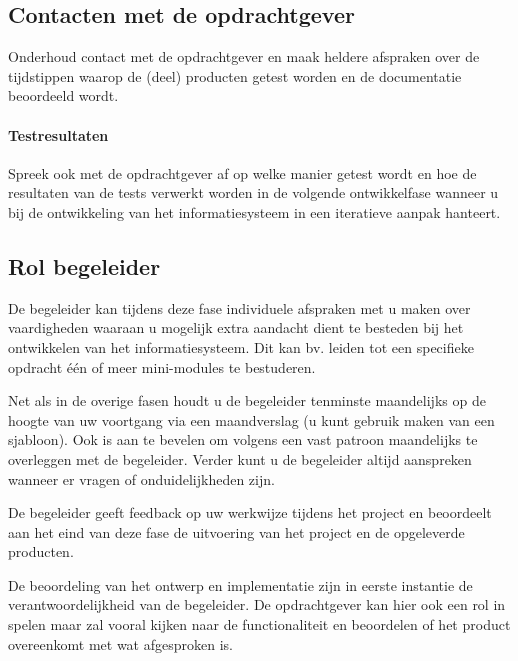 \subsection{Contacten met de opdrachtgever}
    Onderhoud contact met de opdrachtgever en maak heldere afspraken over de
tijdstippen waarop de (deel) producten getest worden en de documentatie
beoordeeld wordt.

\paragraph{Testresultaten}
Spreek ook met de opdrachtgever af op welke manier getest wordt en hoe
de resultaten van de tests verwerkt worden in de volgende ontwikkelfase
wanneer u bij de ontwikkeling van het informatiesysteem in een iteratieve
aanpak hanteert.

\subsection{Rol begeleider}
De begeleider kan tijdens deze fase individuele afspraken met u maken over
vaardigheden waaraan u mogelijk extra aandacht dient te besteden bij het
ontwikkelen van het informatiesysteem. Dit kan bv. leiden tot een specifieke
opdracht één of meer mini-modules te bestuderen.

Net als in de overige fasen houdt u de begeleider tenminste maandelijks op
de hoogte van uw voortgang via een maandverslag (u kunt gebruik maken van een
sjabloon). Ook is aan te bevelen om volgens een vast patroon maandelijks te
overleggen met de begeleider. Verder kunt u de begeleider altijd aanspreken
wanneer er vragen of onduidelijkheden zijn.

De begeleider  geeft feedback op uw werkwijze tijdens het project en
beoordeelt aan het eind van deze fase de uitvoering van het project en de
opgeleverde producten.

De beoordeling van het ontwerp en implementatie zijn in eerste instantie de
verantwoordelijkheid van de begeleider. De opdrachtgever kan hier ook een rol in
spelen maar zal vooral kijken naar de functionaliteit en beoordelen of het
product overeenkomt met wat afgesproken is.

